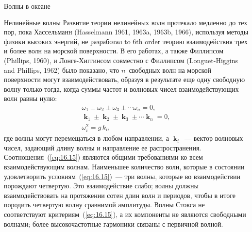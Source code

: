 \begin{chapter}{Волны в океане}
\begin{section}{Нелинейные волны}
Развитие теории нелинейных волн протекало медленно до тех пор, пока
Хассельманн (Hasselmann 1961, 1963a, 1963b, 1966), используя методы
физики высоких энергий, не разработал 
to 6th order теорию взаимодействия трех и более волн на морской поверхности.
В его работах, а также Филлипсом (Phillips, 1960), 
и Лонге-Хиггинсом совместно с Филлипсом (Longuet-Higgins and Phillips, 1962) 
было показано, что $n$~свободных волн на морской поверхности могут 
взаимодействовать, образуя в результате еще одну свободную волну только тогда,
когда суммы частот и волновых чисел взаимодействующих волн равны нулю:
\begin{subequations}\label{eq:16.15}
\begin{eqnarray}
 & \omega _{1} \pm \omega _{2} \pm \omega _{3} \pm \cdots \omega _{n}  = 0, & \\
 & \mbfk_{1} \pm  \mbfk_{2} \pm  \mbfk_{3} \pm \cdots \mbfk_{n} =  0,  & \\
 & \omega_{i}^{2} = g \, k_{i}, &
\end{eqnarray}
\end{subequations}
где волны могут перемещаться в любом направлении, а $\mbfk_{i}$~--- вектор
волновых чисел, задающий длину волны и направление ее распространения.
Соотношения~(\ref{eq:16.15}) являются общими требованиями ко всем 
взаимодействующим волнам. Наименьшее количество волн, которые в состоянии
удовлетворить условиям~(\ref{eq:16.15})~--- три волны, которые во 
взаимодействии порождают четвертую. Это взаимодействие слабо; волны должны
взаимодействовать на протяжении сотен длин волн и периодов, чтобы
в итоге породить четвертую волну сравнимой амплитуды. Волны Стокса не
соответствуют критериям~(\ref{eq:16.15}), а их компоненты не являются
свободными волнами; более высокочастотные гармоники связаны с первичной волной.
%

\end{section}
\end{chapter}
